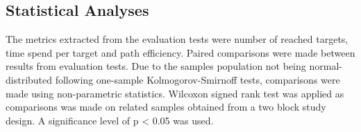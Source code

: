 \subsection{Statistical Analyses}
The metrics extracted from the evaluation tests were number of reached targets, time spend per target and path efficiency. Paired comparisons were made between results from evaluation tests. Due to the samples population not being normal-distributed following one-sample Kolmogorov-Smirnoff tests, comparisons were made using non-parametric statistics. Wilcoxon signed rank test was applied as comparisons was made on related samples obtained from a two block study design. A significance level of p < 0.05 was used.